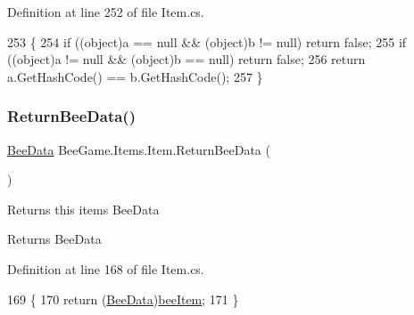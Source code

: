 Definition at line 252 of file Item.\+cs.


\begin{DoxyCode}
253         \{
254             \textcolor{keywordflow}{if} ((\textcolor{keywordtype}{object})a == null && (\textcolor{keywordtype}{object})b != null) \textcolor{keywordflow}{return} \textcolor{keyword}{false};
255             \textcolor{keywordflow}{if} ((\textcolor{keywordtype}{object})a != null && (\textcolor{keywordtype}{object})b == null) \textcolor{keywordflow}{return} \textcolor{keyword}{false};
256             \textcolor{keywordflow}{return} a.GetHashCode() == b.GetHashCode();
257         \}
\end{DoxyCode}
\mbox{\label{struct_bee_game_1_1_items_1_1_item_a3751a7c44aa4ff5975f1487ade757d9f}} 
\subsubsection{\texorpdfstring{Return\+Bee\+Data()}{ReturnBeeData()}}
{\footnotesize\ttfamily \hyperlink{struct_bee_game_1_1_bee_1_1_bee_data}{Bee\+Data} Bee\+Game.\+Items.\+Item.\+Return\+Bee\+Data (\begin{DoxyParamCaption}{ }\end{DoxyParamCaption})}



Returns this items Bee\+Data 

\begin{DoxyReturn}{Returns}
Bee\+Data
\end{DoxyReturn}


Definition at line 168 of file Item.\+cs.


\begin{DoxyCode}
169         \{
170             \textcolor{keywordflow}{return} (\hyperlink{struct_bee_game_1_1_bee_1_1_bee_data}{BeeData})\hyperlink{struct_bee_game_1_1_items_1_1_item_a0593f3b7b3ff5daa864f3c6d0ccd77ca}{beeItem};
171         \}
\end{DoxyCode}
\mbox{\label{struct_bee_game_1_1_items_1_1_item_a1c2f63541269f310381704fc7cc5bc5d}} 
